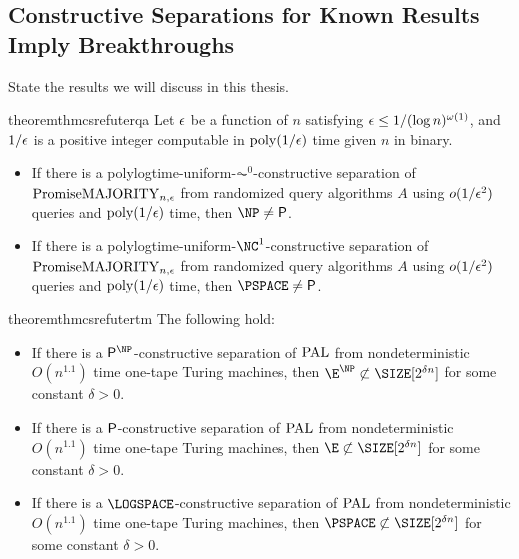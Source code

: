 \subsection{Constructive Separations for Known Results Imply Breakthroughs}


State the results we will discuss in this thesis.

\begin{restatable}{theorem}{thmcsrefuterqa}\label{thm:csrefuterqa} 
	Let $\epsilon$ be a function of $n$ satisfying $\epsilon \leq 1/(\log n)^{\omega(1)}$, and $1/\epsilon$ is a positive integer
     computable in $\text{poly}(1/\epsilon)$ time given $n$ in binary.
	\begin{itemize}
		\item If there is a polylogtime-uniform-$\AC^0$-constructive separation of $\mathrm{PromiseMAJORITY}_{n,\epsilon}$ from randomized
         query algorithms $A$ using $o(1/\epsilon^2)$ queries and $\text{poly}(1/\epsilon)$ time, then $\NP \ne \PTIME$.
		\item If there is a polylogtime-uniform-$\NC^1$-constructive separation of $\mathrm{PromiseMAJORITY}_{n,\epsilon}$ from randomized
         query algorithms $A$ using $o(1/\epsilon^2)$ queries and $\text{poly}(1/\epsilon)$ time, then $\PSPACE \ne \PTIME$.
	\end{itemize}
\end{restatable}

\begin{restatable}{theorem}{thmcsrefutertm}\label{thm:csrefutertm} 
The following hold:
	\begin{itemize}
	    \item If there is a $\PTIME^{\NP}$-constructive separation of $\mathrm{PAL}$
		from nondeterministic $O(n^{1.1})$ time one-tape Turing machines, then
		$\E^{\NP} \not \subset \SIZE[2^{\delta n}]$ for some constant $\delta >0$.
	    
        \item If there is a $\mathsf{P}$-constructive separation of $\mathrm{PAL}$ 
		from nondeterministic $O(n^{1.1})$ time one-tape Turing machines, then
		 $\E \not \subset \SIZE[2^{\delta n}]$ for some constant $\delta >0$.
        
        \item If there is a $\LOGSPACE$-constructive separation of $\mathrm{PAL}$ 
		from nondeterministic $O(n^{1.1})$ time one-tape Turing machines, then
		 $\PSPACE \not \subset \SIZE[2^{\delta n}]$ for some constant $\delta >0$.
	\end{itemize}
\end{restatable}


